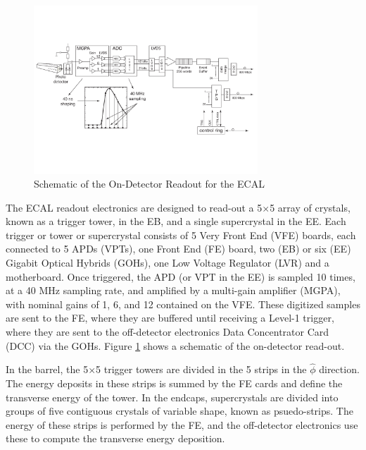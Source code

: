 \begin{figure}[h]
   \centering
  \includegraphics[width=0.75\textwidth]{Figures/CMS_Diagrams/ECAL__OnDetectorReadOut.pdf}
  \caption{Schematic of the On-Detector Readout for the ECAL } \label{fig:ecal_readout}
\end{figure}

\par The ECAL readout electronics are designed to read-out a 5$\times$5
array of crystals, known as a trigger tower, in the EB, and a single
supercrystal in the EE.  Each trigger or tower or supercrystal
consists of 5 Very Front End (VFE) boards, each connected to 5 APDs
(VPTs), one Front End (FE) board, two (EB) or six (EE) Gigabit Optical
Hybrids (GOHs), one Low Voltage Regulator (LVR) and a motherboard.
Once triggered, the APD (or VPT in the EE) is sampled 10 times, at a
40 MHz sampling rate, and amplified by a multi-gain amplifier (MGPA),
with nominal gains of 1, 6, and 12 contained on the VFE.  These
digitized samples are sent to the FE, where they are buffered until
receiving a Level-1 trigger, where they are sent to the off-detector
electronics Data Concentrator Card (DCC) via the GOHs.  Figure
\ref{fig:ecal_readout} shows a schematic of the on-detector read-out. 

\par In the barrel, the 5$\times$5 trigger towers are divided in the 5
strips in the $\hat{\phi}$ direction.  The energy deposits in these
strips is summed by the FE cards and define the transverse energy of
the tower.  In the endcaps, supercrystals are divided into groups of
five contiguous crystals of variable shape, known as
psuedo-strips. The energy of these strips is performed by the FE, and
the off-detector electronics use these to compute the transverse energy
deposition.  

